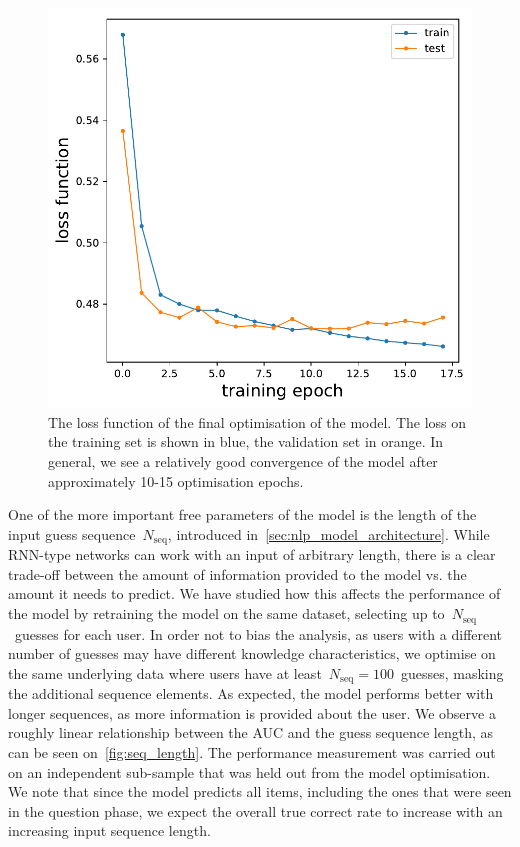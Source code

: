 \begin{figure}[ht]
\centering
\includegraphics[width=0.5\linewidth]{figures/lingvist/loss.pdf}
\caption[Loss function for the knowledge estimation model]{The loss function of the final optimisation of the model. The loss on the training set is shown in blue, the validation set in orange. In general, we see a relatively good convergence of the model after approximately 10-15 optimisation epochs.} 
\label{fig:loss} 
\end{figure} 

One of the more important free parameters of the model is the length of the input guess sequence~$N_{\mathrm{seq}}$, introduced in~\cref{sec:nlp_model_architecture}. While RNN-type networks can work with an input of arbitrary length, there is a clear trade-off between the amount of information provided to the model vs. the amount it needs to predict.
We have studied how this affects the performance of the model by retraining the model on the same dataset, selecting up to~$N_{\mathrm{seq}}$~guesses for each user. In order not to bias the analysis, as users with a different number of guesses may have different knowledge characteristics, we optimise on the same underlying data where users have at least~$N_{\mathrm{seq}} = 100$~guesses, masking the additional sequence elements. As expected, the model performs better with longer sequences, as more information is provided about the user. We observe a roughly linear relationship between the AUC and the guess sequence length, as can be seen on~\cref{fig:seq_length}. The performance measurement was carried out on an independent sub-sample that was held out from the model optimisation. We note that since the model predicts all items, including the ones that were seen in the question phase, we expect the overall true correct rate to increase with an increasing input sequence length.

